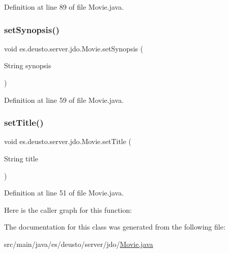 Definition at line 89 of file Movie.\+java.

\mbox{\label{classes_1_1deusto_1_1server_1_1jdo_1_1_movie_a8bc588baca5c14a900a83d8a0326542c}} 
\subsubsection{\texorpdfstring{setSynopsis()}{setSynopsis()}}
{\footnotesize\ttfamily void es.\+deusto.\+server.\+jdo.\+Movie.\+set\+Synopsis (\begin{DoxyParamCaption}\item[{String}]{synopsis }\end{DoxyParamCaption})}



Definition at line 59 of file Movie.\+java.

\mbox{\label{classes_1_1deusto_1_1server_1_1jdo_1_1_movie_ae5ef76349074d7d94803152daacc9e54}} 
\subsubsection{\texorpdfstring{setTitle()}{setTitle()}}
{\footnotesize\ttfamily void es.\+deusto.\+server.\+jdo.\+Movie.\+set\+Title (\begin{DoxyParamCaption}\item[{String}]{title }\end{DoxyParamCaption})}



Definition at line 51 of file Movie.\+java.

Here is the caller graph for this function\+:


The documentation for this class was generated from the following file\+:\begin{DoxyCompactItemize}
\item 
src/main/java/es/deusto/server/jdo/\mbox{\hyperlink{_movie_8java}{Movie.\+java}}\end{DoxyCompactItemize}
